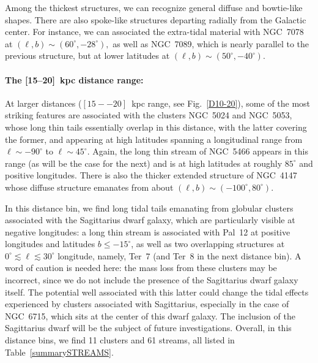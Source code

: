     Among the thickest structures, we can recognize general diffuse and bowtie-like shapes. There are also spoke-like structures departing radially from the Galactic center. For instance, we can associated the extra-tidal material with NGC~7078 at $(\ell, b)\sim(60^\circ,-28^{\circ}),$ as well as NGC~7089, which is nearly parallel to the previous structure, but at lower latitudes at $(\ell, b)\sim(50^\circ,-40^{\circ})$.

    \paragraph{The [15--20]~kpc distance range: }
    At larger distances ($[15--20]$~kpc range, see Fig.~\ref{D10-20}), some of the most striking features are associated with the clusters NGC~5024 and NGC~5053, whose long thin tails essentially overlap in this distance, with the latter covering the former, and appearing at high latitudes spanning a longitudinal range from $\ell \sim -90^{\circ}$ to $\ell \sim 45^{\circ}$. Again, the long thin stream of NGC~5466 appears in this range (as will be the case for the next) and is at high latitudes at roughly $85^{\circ}$ and positive longitudes. There is also the thicker extended structure of NGC~4147 whose diffuse structure emanates from about $(\ell, b)\sim(-100^{\circ},80^{\circ})$.

    In this distance bin, we find long tidal tails emanating from globular clusters associated  with the Sagittarius dwarf galaxy, which are particularly visible at negative longitudes: a long thin stream is associated  with Pal~12 at positive longitudes and latitudes $b \le-15^{\circ}$, as well as two overlapping structures at $0^\circ \lesssim \ell \lesssim 30^\circ$ longitude, namely, Ter~7 (and Ter~8 in the next distance bin). A word of caution is needed here: the mass loss from these clusters may be incorrect, since we do not include the presence of the Sagittarius dwarf galaxy itself. The potential well associated with this latter could change the tidal effects experienced by clusters associated with Sagittarius, especially in the case of NGC~6715, which sits at the center of this dwarf galaxy. The inclusion of the Sagittarius dwarf will be the subject of future investigations. Overall, in this distance bins, we find 11 clusters  and 61 streams, all listed in Table~\ref{summarySTREAMS}.

